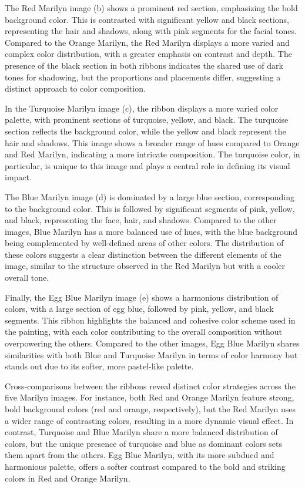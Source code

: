 \documentclass{article}
\begin{document}
The Red Marilyn image (b) shows a prominent red section, emphasizing the
bold background color. This is contrasted with significant yellow and
black sections, representing the hair and shadows, along with pink
segments for the facial tones. Compared to the Orange Marilyn, the Red
Marilyn displays a more varied and complex color distribution, with a
greater emphasis on contrast and depth. The presence of the black
section in both ribbons indicates the shared use of dark tones for
shadowing, but the proportions and placements differ, suggesting a
distinct approach to color composition.

In the Turquoise Marilyn image (c), the ribbon displays a more varied
color palette, with prominent sections of turquoise, yellow, and black.
The turquoise section reflects the background color, while the yellow
and black represent the hair and shadows. This image shows a broader
range of hues compared to Orange and Red Marilyn, indicating a more
intricate composition. The turquoise color, in particular, is unique to
this image and plays a central role in defining its visual impact.

The Blue Marilyn image (d) is dominated by a large blue section,
corresponding to the background color. This is followed by significant
segments of pink, yellow, and black, representing the face, hair, and
shadows. Compared to the other images, Blue Marilyn has a more balanced
use of hues, with the blue background being complemented by well-defined
areas of other colors. The distribution of these colors suggests a clear
distinction between the different elements of the image, similar to the
structure observed in the Red Marilyn but with a cooler overall tone.

Finally, the Egg Blue Marilyn image (e) shows a harmonious distribution
of colors, with a large section of egg blue, followed by pink, yellow,
and black segments. This ribbon highlights the balanced and cohesive
color scheme used in the painting, with each color contributing to the
overall composition without overpowering the others. Compared to the
other images, Egg Blue Marilyn shares similarities with both Blue and
Turquoise Marilyn in terms of color harmony but stands out due to its
softer, more pastel-like palette.

Cross-comparisons between the ribbons reveal distinct color strategies
across the five Marilyn images. For instance, both Red and Orange
Marilyn feature strong, bold background colors (red and orange,
respectively), but the Red Marilyn uses a wider range of contrasting
colors, resulting in a more dynamic visual effect. In contrast,
Turquoise and Blue Marilyn share a more balanced distribution of colors,
but the unique presence of turquoise and blue as dominant colors sets
them apart from the others. Egg Blue Marilyn, with its more subdued and
harmonious palette, offers a softer contrast compared to the bold and
striking colors in Red and Orange Marilyn.
\end{document}
